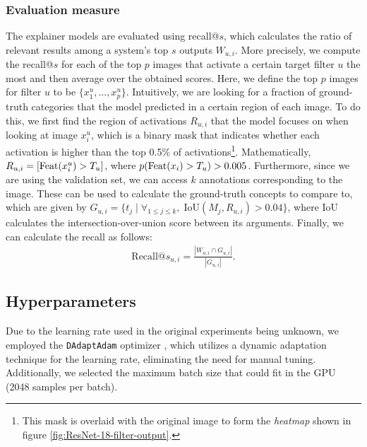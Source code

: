 \subsubsection{Evaluation measure} \label{sec:Evaluation measure}
The explainer models are evaluated using recall@$s$, which calculates the ratio of relevant results among a system's top $s$ outputs $W_{u, i}$. More precisely, we compute the recall@$s$ for each of the top $p$ images that activate a certain target filter $u$ the most and then average over the obtained scores. Here, we define the top $p$ images for filter $u$ to be $\{x_1^u, \dots, x_p^u\}$. Intuitively, we are looking for a fraction of ground-truth categories that the model predicted in a certain region of each image. To do this, we first find the region of activations $R_{u, i}$ that the model focuses on when looking at image $x_i^u$, which is a binary mask that indicates whether each activation is higher than the top 0.5\% of activations\footnote{This mask is overlaid with the original image to form the \textit{heatmap} shown in figure \ref{fig:ResNet-18-filter-output}.}. Mathematically, $R_{u, i} = [\text{Feat}(x_i^u) > T_u]$, where $p(\text{Feat}(x_i) > T_u) > 0.005$. Furthermore, since we are using the validation set, we can access $k$ annotations corresponding to the image. These can be used to calculate the ground-truth concepts to compare to, which are given by $G_{u, i} = \{t_j \;|\; \forall_{1 \leq j \leq k},\; \text{IoU}(M_j, R_{u, i}) > 0.04\}$, where $\text{IoU}$ calculates the intersection-over-union score between its arguments. Finally, we can calculate the recall as follows:
\begin{align*}
    \text{Recall@}s_{u, i} = \frac{| W_{u, i} \cap G_{u, i} |}{| G_{u, i} |}.
\end{align*}

\subsection{Hyperparameters} \label{sec:Hyperparameters}
Due to the learning rate used in the original experiments being unknown, we employed the \texttt{DAdaptAdam} optimizer \cite{defazio2023learning}, which utilizes a dynamic adaptation technique for the learning rate, eliminating the need for manual tuning. Additionally, we selected the maximum batch size that could fit in the GPU (2048 samples per batch).

